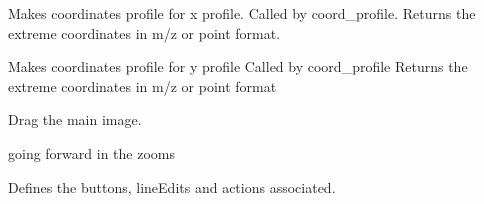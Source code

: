 \documentclass[letterpaper,10pt,openany,oneside]{sphinxmanual}
\begin{document}
\begin{fulllineitems}
\begin{fulllineitems}
\end{fulllineitems}


\begin{fulllineitems}
\label{rst/visu2d:Visu.interface_actions.INTERACT.coord_profile_x}
Makes coordinates profile for x profile.
Called by coord\_profile.
Returns the extreme coordinates in m/z or point format.

\end{fulllineitems}


\begin{fulllineitems}
\label{rst/visu2d:Visu.interface_actions.INTERACT.coord_profile_y}
Makes coordinates profile for y profile 
Called by coord\_profile
Returns the extreme coordinates in m/z or point format

\end{fulllineitems}


\begin{fulllineitems}
\label{rst/visu2d:Visu.interface_actions.INTERACT.drag_connect}
Drag the main image.

\end{fulllineitems}


\begin{fulllineitems}
\label{rst/visu2d:Visu.interface_actions.INTERACT.forwzoo}
going forward in the zooms

\end{fulllineitems}


\begin{fulllineitems}
\label{rst/visu2d:Visu.interface_actions.INTERACT.interfGraph}
Defines the buttons, lineEdits and actions associated.

\end{fulllineitems}


\end{fulllineitems}
\end{document}

